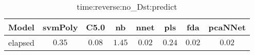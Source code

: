 \begin{table}[!ht]
	\centering
	\begin{tabular}{|c|c|c|c|c|c|c|c|}
		\hline
		Model & svmPoly & C5.0 & nb & nnet & pls & fda & pcaNNet \\ \hline
		elapsed & $0.35$ & $0.08$ & $1.45$ & $0.02$ & $0.24$ & $0.02$ & $0.02$ \\ \hline
	\end{tabular}
	\caption{time:reverse:no_Dst:predict}
	\label{tab:time:reverse:no_Dst:predict}
\end{table}
